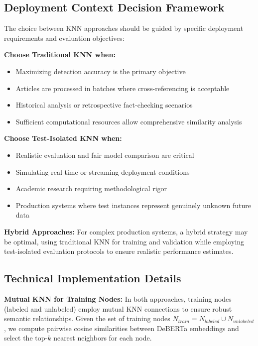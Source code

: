 \subsection{Deployment Context Decision Framework}

The choice between KNN approaches should be guided by specific deployment requirements and evaluation objectives:

\textbf{Choose Traditional KNN when:}
\begin{itemize}
    \item Maximizing detection accuracy is the primary objective
    \item Articles are processed in batches where cross-referencing is acceptable
    \item Historical analysis or retrospective fact-checking scenarios
    \item Sufficient computational resources allow comprehensive similarity analysis
\end{itemize}

\textbf{Choose Test-Isolated KNN when:}
\begin{itemize}
    \item Realistic evaluation and fair model comparison are critical
    \item Simulating real-time or streaming deployment conditions
    \item Academic research requiring methodological rigor
    \item Production systems where test instances represent genuinely unknown future data
\end{itemize}

\textbf{Hybrid Approaches:} For complex production systems, a hybrid strategy may be optimal, using traditional KNN for training and validation while employing test-isolated evaluation protocols to ensure realistic performance estimates.

\subsection{Technical Implementation Details}

\textbf{Mutual KNN for Training Nodes:} In both approaches, training nodes (labeled and unlabeled) employ mutual KNN connections to ensure robust semantic relationships. Given the set of training nodes $N_{train} = N_{labeled} \cup N_{unlabeled}$, we compute pairwise cosine similarities between DeBERTa embeddings and select the top-$k$ nearest neighbors for each node.

